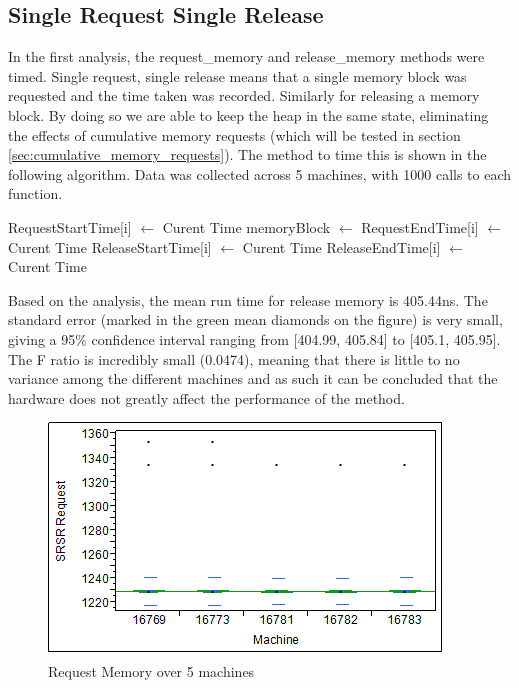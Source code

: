 \documentclass[12pt]{report}
\begin{document}
\subsection{Single Request Single Release}
\label{sec:single_request_single_release}
In the first analysis, the request\_memory and release\_memory methods were timed. Single request, single release means that a single memory block was requested and the time taken was recorded. Similarly for releasing a memory block. By doing so we are able to keep the heap in the same state, eliminating the effects of cumulative memory requests (which will be tested in section \ref{sec:cumulative_memory_requests}). The method to time this is shown in the following algorithm. Data was collected across 5 machines, with 1000 calls to each function.

\begin{algorithmic}
      \State RequestStartTime[i] $\gets$ Curent Time
      \State memoryBlock $\gets$  
      \State RequestEndTime[i] $\gets$ Curent Time
      \State ReleaseStartTime[i] $\gets$ Curent Time
      \State {}
      \State ReleaseEndTime[i] $\gets$ Curent Time
    \EndFor
  \EndFunction
\end{algorithmic}

Based on the analysis, the mean run time for release memory is 405.44ns. The standard error (marked in the green mean diamonds on the figure) is very small, giving a 95\% confidence interval ranging from [404.99, 405.84] to [405.1, 405.95]. The F ratio is incredibly small (0.0474), meaning that there is little to no variance among the different machines and as such it can be concluded that the hardware does not greatly affect the performance of the method.

\begin{figure}[h!]
  \centering
    \includegraphics{SRSRRequestMemory.png}
  \caption{Request Memory over 5 machines}
\end{figure}
\end{document}
